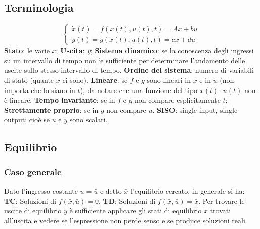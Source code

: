 \fontsize{6pt}{8pt}\selectfont
{}
\begin{landscape}
\begin{multicols*}{3}
    \subsection*{Terminologia}
    \[
        \begin{cases}
            \dot{x}(t) = f(x(t),u(t),t) = Ax + bu\\
            y(t) = g(x(t),u(t),t) = cx +du
        \end{cases}
    \]
    \textbf{Stato}: le varie $x$;\newline
    \textbf{Uscita}: $y$;\newline
    \textbf{Sistema dinamico}: se la conoscenza degli ingressi su un intervallo di tempo
    non `e sufficiente per determinare l’andamento delle uscite sullo stesso intervallo di tempo.\newline
    \textbf{Ordine del sistema}: numero di variabili di stato (quante $x$ ci sono).\newline
    \textbf{Lineare}: se $f$ e $g$ sono lineari in $x$ e in $u$ (non importa che lo siano in $t$), da notare che una funzione del tipo $x(t) \cdot u(t)$ non è lineare.\newline
    \textbf{Tempo invariante}: se in $f$ e $g$ non compare esplicitamente $t$;\newline
    \textbf{Strettamente proprio}: se in $g$ non compare $u$.\newline
    \textbf{SISO}: single input, single output; cioè se $u$ e $y$ sono scalari.
    \subsection*{Equilibrio}
    \subsubsection*{Caso generale}
    Dato l'ingresso costante $u = \bar{u}$ e detto $\bar{x}$ l'equilibrio cercato, in generale si ha:\newline
    \textbf{TC}: Soluzioni di $f(\bar{x},\bar{u}) = 0$.\newline
    \textbf{TD}: Soluzioni di $f(\bar{x}, \bar{u}) = \bar{x}$.\newline
    Per trovare le uscite di equilibrio $\bar{y}$ è sufficiente applicare gli stati di equilibrio $\bar{x}$ trovati all'uscita e vedere se l'espressione non perde senso e se produce soluzioni reali.

\end{multicols*}
\end{landscape}
